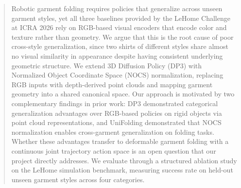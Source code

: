 \begin{abstract}
Robotic garment folding requires policies that generalize across unseen garment styles, yet all three baselines provided by the LeHome Challenge at ICRA 2026 rely on RGB-based visual encoders that encode color and texture rather than geometry. We argue that this is the root cause of poor cross-style generalization, since two shirts of different styles share almost no visual similarity in appearance despite having consistent underlying geometric structure. We extend 3D Diffusion Policy (DP3) with Normalized Object Coordinate Space (NOCS) normalization, replacing RGB inputs with depth-derived point clouds and mapping garment geometry into a shared canonical space. Our approach is motivated by two complementary findings in prior work: DP3 demonstrated categorical generalization advantages over RGB-based policies on rigid objects via point cloud representations, and UniFolding demonstrated that NOCS normalization enables cross-garment generalization on folding tasks. Whether these advantages transfer to deformable garment folding with a continuous joint trajectory action space is an open question that our project directly addresses. We evaluate through a structured ablation study on the LeHome simulation benchmark, measuring success rate on held-out unseen garment styles across four categories.
\end{abstract}
